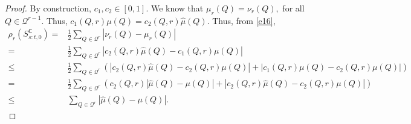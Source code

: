 \documentclass[12pts]{article}
\newcommand{\sQ}{ \mathscr{Q}}
\newcommand{\hmu}{\hat{\mu}}
\begin{document}
\begin{proof}
 By construction, $c_1, c_2 \in [0,1]$. We know that $\mu_r(Q) = \nu_r(Q), $ for all $Q \in \sQ^{r-1}$. Thus, $c_1(Q,r) \mu(Q) = c_2(Q,r) \hmu(Q)$. Thus, from \eqref{e16}, 
 \begingroup
 \allowdisplaybreaks
 \begin{align}
     \rho_r(S_{s:t,0}^\mathsf{C}) = & \frac{1}{2} \sum_{Q \in \sQ^{r}} |\nu_r(Q) - \mu_r(Q)| \nonumber\\
     = & \frac{1}{2} \sum_{Q \in \sQ^{r}} |c_2(Q,r) \hmu(Q) - c_1(Q,r) \mu(Q) | \nonumber\\
     \le &  \frac{1}{2} \sum_{Q \in \sQ^{r}} \left(|c_2(Q,r) \hmu(Q) - c_2(Q,r) \mu(Q) | + | c_1(Q,r) \mu(Q) - c_2(Q,r) \mu(Q)| \right) \nonumber\\
     = & \frac{1}{2} \sum_{Q \in \sQ^{r}} \left( c_2(Q,r)| \hmu(Q) - \mu(Q) | + | c_2(Q,r) \hmu(Q) - c_2(Q,r) \mu(Q)|  \right) \nonumber\\
     \le & \sum_{Q \in \sQ^{r}} |\hmu(Q) - \mu(Q) | \label{e17}.
 \end{align}
 \endgroup


\end{proof}
\end{document}
